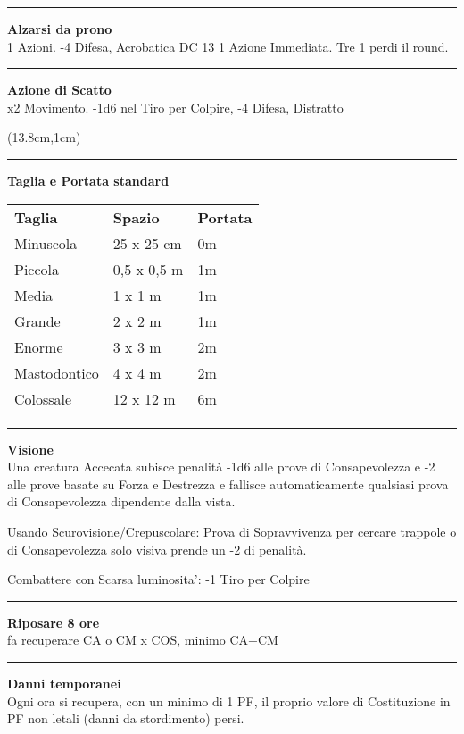 \documentclass[a4paper,12 pt,openany]{book}
\newcommand{\riga}{\rule{\textwidth}{0.4pt}}
\begin{document}
\begin{textblock*}{8.3cm}
\riga

\textbf{Alzarsi da prono}\\
1 Azioni. -4 Difesa, Acrobatica DC 13 1 Azione Immediata. Tre 1 perdi il round. 

\riga


\textbf{Azione di Scatto}\\
x2 Movimento. -1d6 nel Tiro per Colpire, -4 Difesa, Distratto



\end{textblock*}

\begin{textblock*}{6.2cm}(13.8cm,1cm) %

\riga

\textbf{Taglia e Portata standard}\\
\begin{tabular}{lll}
	\textbf{Taglia}& \textbf{Spazio} &\textbf{Portata}\\
	Minuscola & 25 x 25 cm&0m\\
	Piccola & 0,5 x 0,5 m &1m\\
	Media & 1 x 1 m & 1m\\
	Grande & 2 x 2 m& 1m\\
	Enorme & 3 x 3 m &2m\\
	Mastodontico & 4 x 4 m&2m\\
	Colossale & 12 x 12 m&6m\\	
\end{tabular}

\riga

\textbf{Visione}\\

Una creatura Accecata subisce penalità -1d6 alle prove di Consapevolezza e -2 alle prove basate su Forza e Destrezza e fallisce automaticamente qualsiasi prova di Consapevolezza dipendente dalla vista.

Usando Scurovisione/Crepuscolare: Prova di Sopravvivenza per cercare trappole o di Consapevolezza solo visiva prende un -2 di penalità.

Combattere con Scarsa luminosita': -1 Tiro per Colpire

\riga

\textbf{Riposare 8 ore} \\fa recuperare CA o CM x COS, minimo CA+CM

\riga

\textbf{Danni temporanei}\\ Ogni ora si recupera, con un minimo di 1 PF, il proprio valore di Costituzione in PF non letali (danni da stordimento) persi.


\end{textblock*}
\end{document}
